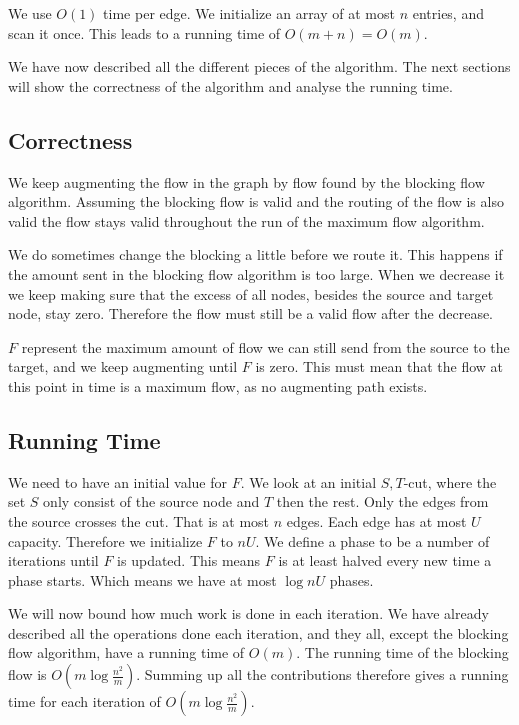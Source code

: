 We use $O(1)$ time per edge. We initialize an array of at most $n$ entries, and scan it once. This leads to a running time of
$O(m+n) = O(m)$.

We have now described all the different pieces of the algorithm. The next sections will show the correctness of the algorithm and
analyse the running time.

\subsection{Correctness} \label{GR-Cor}
We keep augmenting the flow in the graph by flow found by the blocking flow algorithm. Assuming the blocking flow is valid
and the routing of the flow is also valid the flow stays valid throughout the run of the maximum flow algorithm. 

We do sometimes change the blocking a little before we route it. This happens if the amount sent in the blocking flow algorithm is too large.
When we decrease it we keep making sure that the excess of all nodes, besides the source and target node, stay zero. Therefore the 
flow must still be a valid flow after the decrease.

$F$ represent the maximum amount of flow we can still send from the source to the target, and we keep augmenting until $F$ is zero. 
This must mean that the flow at this point in time is a maximum flow, as no augmenting path exists.
	
\subsection{Running Time} \label{GR-RT}
We need to have an initial value for $F$. We look at an initial $S,T$-cut, where the set $S$ only consist of the source node and $T$ then the rest.
Only the edges from the source crosses the cut. That is at most $n$ edges. Each edge has at most $U$ capacity. Therefore we initialize $F$ to
$nU$. We define a phase to be a number of iterations until $F$ is updated. This means $F$ is at least halved every new time a phase starts. 
Which means we have at most $\log{nU}$ phases.
	
We will now bound how much work is done in each iteration. We have already described all the operations
done each iteration, and they all, except the blocking flow algorithm, have a running time of $O(m)$.
The running time of the blocking flow is $O(m\log{\frac{n^2}{m}})$. 
Summing up all the contributions therefore gives a running time for each iteration of $O(m\log{\frac{n^2}{m}})$.

